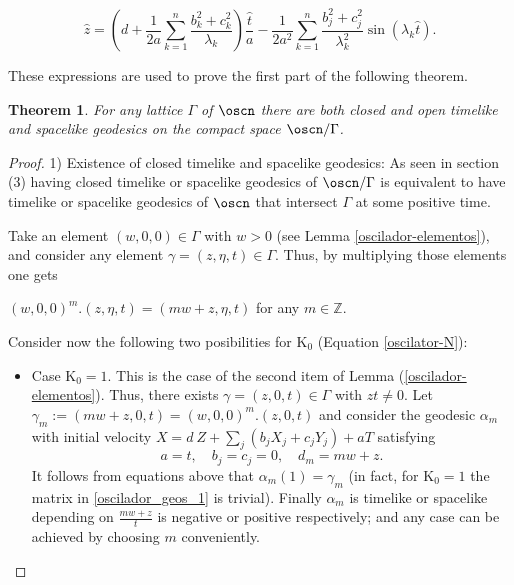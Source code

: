 \documentclass[11pt]{amsart}
\theoremstyle{plain}
\newtheorem{thm}{Theorem}[section]
\theoremstyle{definition}
\theoremstyle{remark}
\begin{document}
		\begin{equation}\label{oscilador_geos_2}
			\hat{z} =  \left(d + \frac{1}{2 a} \sum_{k=1}^{n} \frac{ b_{k}^{2}+c_k^{2}}{\lambda_k}\right)\frac{\hat{t}}{a}- \frac{1}{2 a^{2}}  \sum_{k=1}^{n} \frac{b_{j}^{2}+c_j^2}{\lambda_k^{2}} \sin(\lambda_k \hat{t}).
		\end{equation}
		
		These expressions are used to prove the first part of the following theorem.
		
			\begin{thm}
			For any lattice $\Gamma$ of $\oscn$ there are both closed and open timelike and spacelike geodesics on the compact space $\oscn / \Gamma$.
		\end{thm}
		
		\begin{proof}
						1) Existence of closed timelike and spacelike geodesics: As seen in section (3) having closed timelike or spacelike geodesics of $\oscn/\Gamma$ is equivalent to have timelike or spacelike geodesics of $\oscn$ that intersect $\Gamma$ at some positive time.
			
			Take an element $(w,0,0) \in \Gamma$ with $w>0$ (see Lemma \ref{oscilador-elementos}), and consider any element $\gamma=(z, \eta, t) \in \Gamma$. Thus,  by multiplying those elements one gets  
			
			$(w,0,0)^m.({z}, {\eta},{t})=(m w+{z},{\eta}, {t})$ for any $m \in \mathbb{Z}$. 
			
			Consider now the following two posibilities for $\mathrm{K_0}$ (Equation \eqref{oscilator-N}):
			
			\begin{itemize}
				\item Case $\mathrm{K_0} = 1$. This is the case of the second item of Lemma (\ref{oscilador-elementos}). Thus,  there exists $\gamma = (z,0,t) \in \Gamma$ with $z t \neq 0$. Let $\gamma_m := (m w+z, 0, t)=(w,0,0)^m.(z,0,t)$ and consider the geodesic $\alpha_m$ with initial velocity $X =  d \ Z + \sum_j (b_j X_j + c_j Y_j) + a T$ satisfying 
				$$a=t,\quad b_j=c_j=0, \quad d_m = m w + z.$$ 
				 It follows from equations above that $\alpha_m(1)=\gamma_m$ (in fact, for $\mathrm{K_0}=1$ the matrix in \eqref{oscilador_geos_1} is trivial). Finally $\alpha_m$ is timelike or spacelike depending on  $\frac{mw+z}{t}$ is negative or positive respectively; and  any case can be achieved by choosing $m$ conveniently. 
				

\end{itemize}
\end{proof}
\end{document}
